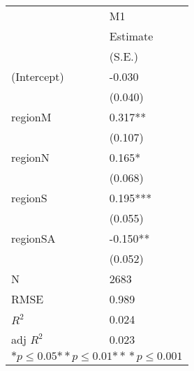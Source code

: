 \begin{tabular}{*{2}{l}}
\hline
                  & M1   \tabularnewline
                   &Estimate \tabularnewline
                 &(S.E.) \tabularnewline
 \hline
 \hline
   (Intercept)     &-0.030 \tabularnewline
                 &(0.040)  \tabularnewline
   regionM         &0.317** \tabularnewline
                 &(0.107)  \tabularnewline
   regionN         &0.165* \tabularnewline
                 &(0.068)  \tabularnewline
   regionS         &0.195*** \tabularnewline
                 &(0.055)  \tabularnewline
   regionSA        &-0.150** \tabularnewline
                 &(0.052)  \tabularnewline
 \hline
 N                 &2683       \tabularnewline
 RMSE             &0.989   \tabularnewline
 $R^2$             &0.024   \tabularnewline
 adj $R^2$         &0.023   \tabularnewline
 \hline
\hline
 
 \multicolumn{2}{c}{${*  p}\le 0.05$${*\!\!*  p}\le 0.01$${*\!\!*\!\!*  p}\le 0.001$}\tabularnewline
 \end{tabular}